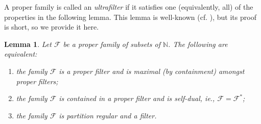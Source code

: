 \documentclass[letter,11pt]{article}
\theoremstyle{plain}
\newtheorem{lemma}[theorem]{Lemma}
\theoremstyle{definition}
\theoremstyle{plain}
\theoremstyle{plain}
\numberwithin{equation}{section}
\newcommand{\N}{\mathbb{N}}
\newcommand{\family}{\mathscr{F}}
\begin{document}
A proper family is called an \emph{ultrafilter} if it satisfies one (equivalently, all) of the properties in the following lemma.  This lemma is well-known (cf. \cite[Thm. 3.6]{hindman_strauss_book_2012}), but its proof is short, so we provide it here.

\begin{lemma}
\label{lemma_equiv_ultrafilter}
    Let $\family$ be a proper family of subsets of $\N$.  The following are equivalent:
    \begin{enumerate}
        \item
        \label{item_family_is_maximal}
        the family $\family$ is a proper filter and is maximal (by containment) amongst proper filters;
        
        \item
        \label{item_family_is_self_dual}
        the family $\family$ is contained in a proper filter and is self-dual, ie., $\family = \family^*$;
        
        \item
        \label{item_family_is_pr_and_filter}
        the family $\family$ is partition regular and a filter.
    \end{enumerate}
\end{lemma}
\end{document}
